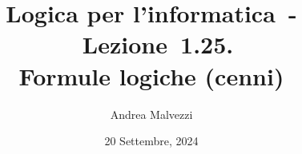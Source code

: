 \documentclass[12pt]{article}
\author{Andrea Malvezzi}
\title{\textbf{Logica per l'informatica~-~Lezione~1.25.\\Formule logiche (cenni)}}
\date{20 Settembre, 2024}
\begin{document}
\maketitle
\pagebreak
\end{document}
